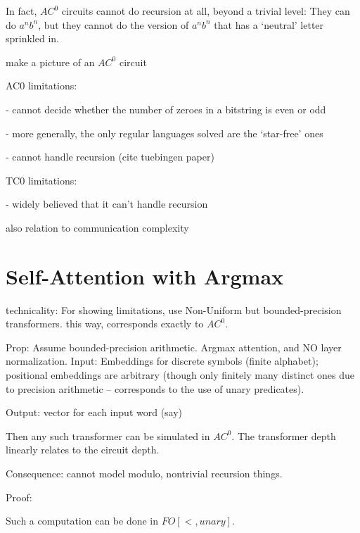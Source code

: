 \documentclass[11pt,a4paper]{article}
\begin{document}
In fact, $AC^0$ circuits cannot do recursion at all, beyond a trivial level:
They can do $a^nb^n$, but they cannot do the version of $a^nb^n$ that has a `neutral' letter sprinkled in.


make a picture of an $AC^0$ circuit



AC0 limitations:

- cannot decide whether the number of zeroes in a bitstring is even or odd

- more generally, the only regular languages solved are the `star-free' ones

- cannot handle recursion (cite tuebingen paper)

TC0 limitations:

- widely believed that it can't handle recursion

also relation to communication complexity

\section{Self-Attention with Argmax}

technicality:
For showing limitations, use Non-Uniform but bounded-precision transformers. this way, corresponds exactly to $AC^0$.

Prop:
Assume bounded-precision arithmetic. Argmax attention, and NO layer normalization.
Input: Embeddings for discrete symbols (finite alphabet); positional embeddings are arbitrary (though only finitely many distinct ones due to precision arithmetic -- corresponds to the use of unary predicates).

Output: vector for each input word (say)

Then any such transformer can be simulated in $AC^0$. The transformer depth linearly relates to the circuit depth.

Consequence: cannot model modulo, nontrivial recursion things.



Proof:

Such a computation can be done in $FO[<,unary]$.
\end{document}
